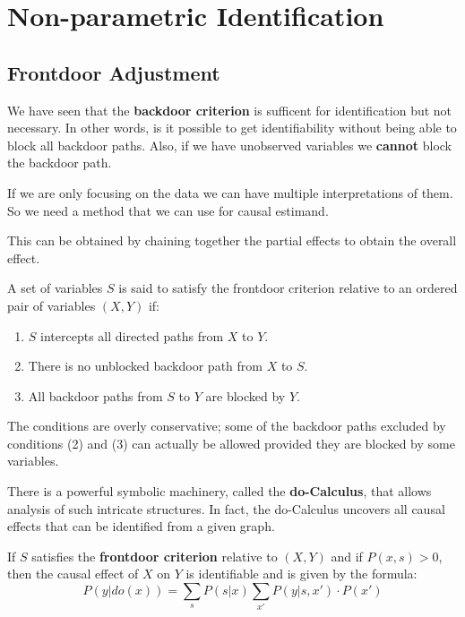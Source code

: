 \chapter{Non-parametric Identification}
\section{Frontdoor Adjustment}
We have seen that the \textbf{backdoor criterion} is sufficent for identification but not
necessary. In other words, is it possible to get identifiability without being able to
block all backdoor paths. Also, if we have unobserved variables we \textbf{cannot} block
the backdoor path.

If we are only focusing on the data we can have multiple  interpretations of them. So we need
a method that we can use for causal estimand.

This can be obtained by chaining together the partial effects to obtain the overall effect.
\begin{definition}
    A set of variables $S$ is said to satisfy the frontdoor criterion relative to an
    ordered pair of variables $(X, Y)$ if:
    \begin{enumerate}
        \item $S$ intercepts all directed paths from $X$ to $Y$.
        \item There is no unblocked backdoor path from $X$ to $S$.
        \item All backdoor paths from $S$ to $Y$ are blocked by $Y$.
    \end{enumerate}
\end{definition}
The conditions are overly conservative; some of the backdoor paths excluded by conditions
(2) and (3) can actually be allowed provided they are blocked by some variables.

There is a powerful symbolic machinery, called the \textbf{do-Calculus}, that allows
analysis of such intricate structures. In fact, the do-Calculus uncovers all causal
effects that can be identified from a given graph.

\begin{definition}
    If $S$ satisfies the \textbf{frontdoor criterion} relative to $(X, Y)$ and if $P(x, s) > 0$,
    then the causal effect of $X$ on $Y$ is identifiable and is given by the formula:
    \begin{equation}
        P(y | do(x)) = \sum_{s} P(s | x) \sum_{x'} P(y | s, x') \cdot P(x')
    \end{equation}
\end{definition}

